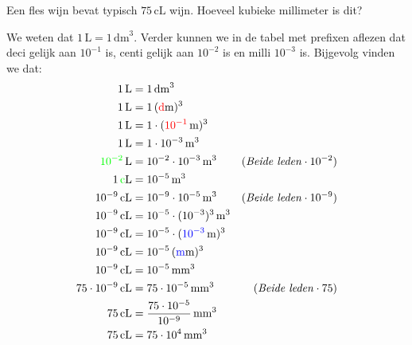 \documentclass{ximera}
\begin{document}
\begin{example}[foldable=true,title={Voorbeeld: Omzetten van cL naar kubieke millimeter}]\nl
    Een fles wijn bevat typisch $75 \, \mathrm{cL}$ wijn. Hoeveel kubieke millimeter is dit?

    \begin{solution}\nl
        We weten dat $1 \, \mathrm{L} = 1 \, \mathrm{dm}^{3}$. Verder kunnen we in de tabel met prefixen aflezen dat deci gelijk aan $10^{-1}$ is, centi gelijk aan $10^{-2}$ is en milli $10^{-3}$ is. Bijgevolg vinden we dat:
        \begin{align*}
        1 \, \mathrm{L} & = 1 \, \mathrm{dm}^{3} & \\
        1 \, \mathrm{L} & = 1\, (\textcolor{red}{\mathrm{d}}\mathrm{m})^{3} & \\
        1 \, \mathrm{L} & = 1 \cdot (\textcolor{red}{10^{-1}} \, \mathrm{m})^{3} & \\
        1 \, \mathrm{L} & = 1 \cdot 10^{-3} \, \mathrm{m}^{3} & \\
        \textcolor{green}{10^{-2}} \, \mathrm{L} & = 10^{-2} \cdot 10^{-3} \, \mathrm{m}^{3} & (\text{\textit{Beide leden}} \cdot 10^{-2}) \\
        1 \, \textcolor{green}{\mathrm{c}}\mathrm{L} & = 10^{-5} \, \mathrm{m}^{3} & \\
        10^{-9} \, \mathrm{cL} & = 10^{-9} \cdot 10^{-5} \, \mathrm{m}^{3} & (\text{\textit{Beide leden}} \cdot 10^{-9}) \\
        10^{-9} \, \mathrm{cL} & = 10^{-5} \cdot (10^{-3})^{3} \, \mathrm{m}^{3} & \\
        10^{-9} \, \mathrm{cL} & = 10^{-5} \cdot (\textcolor{blue}{10^{-3}} \, \mathrm{m})^{3} & \\
        10^{-9} \, \mathrm{cL} & = 10^{-5} \, (\textcolor{blue}{\mathrm{m}}\mathrm{m})^{3} & \\
        10^{-9} \, \mathrm{cL} & = 10^{-5} \, \mathrm{mm}^{3} & \\
        75 \cdot 10^{-9} \, \mathrm{cL} & = 75 \cdot 10^{-5} \, \mathrm{mm}^{3} & (\text{\textit{Beide leden}} \cdot 75) \\
        75 \, \mathrm{cL} & = \frac{75 \cdot 10^{-5}}{10^{-9}} \, \mathrm{mm}^{3} & \\
        75 \, \mathrm{cL} & = 75 \cdot 10^{4} \, \mathrm{mm}^{3} & \\
        \end{align*}
    \end{solution}
\end{example}
\end{document}
